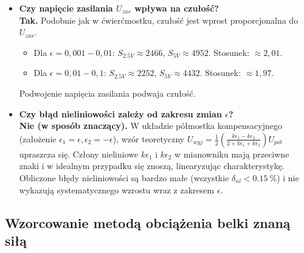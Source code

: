 \documentclass[12pt, a4paper]{article}
\begin{document}
	\begin{itemize}
		\item \textbf{Czy napięcie zasilania $U_{zas}$ wpływa na czułość?} \\
		\textbf{Tak.} Podobnie jak w ćwierćmostku, czułość jest wprost proporcjonalna do $U_{zas}$.
		\begin{itemize}
			\item Dla $\epsilon=0,001-0,01$: $S_{2.5V} \approx 2466$, $S_{5V} \approx 4952$. Stosunek: $\approx 2,01$.
			\item Dla $\epsilon=0,01-0,1$: $S_{2.5V} \approx 2252$, $S_{5V} \approx 4432$. Stosunek: $\approx 1,97$.
		\end{itemize}
		Podwojenie napięcia zasilania podwaja czułość.
		
		\item \textbf{Czy błąd nieliniowości zależy od zakresu zmian $\epsilon$?} \\
		\textbf{Nie (w sposób znaczący).} W układzie półmostka kompensacyjnego (założenie $\epsilon_1 = \epsilon, \epsilon_2 = -\epsilon$), wzór teoretyczny $U_{wyj}=\frac{1}{2}(\frac{k\epsilon_1 - k\epsilon_2}{2+k\epsilon_1+k\epsilon_2})U_{pot}$ upraszcza się. Człony nieliniowe $k\epsilon_1$ i $k\epsilon_2$ w mianowniku mają przeciwne znaki i w idealnym przypadku się znoszą, linearyzując charakterystykę. Obliczone błędy nieliniowości są bardzo małe (wszystkie $\delta_{nl} < \SI{0,15}{\percent}$) i nie wykazują systematycznego wzrostu wraz z zakresem $\epsilon$.
	\end{itemize}
	
	\subsection{Wzorcowanie metodą obciążenia belki znaną siłą}
	
\end{document}
